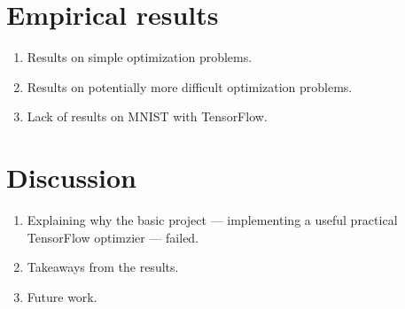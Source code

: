 \documentclass{article}
\begin{document}
\section{Empirical results}


\begin{enumerate}
  \item Results on simple optimization problems. 
  \item Results on potentially more difficult optimization problems.
  \item Lack of results on MNIST with TensorFlow.
\end{enumerate}


\section{Discussion}


\begin{enumerate}
  \item Explaining why the basic project --- implementing a useful practical
    TensorFlow optimzier --- failed.
  \item Takeaways from the results.
  \item Future work.
\end{enumerate}


\printbibliography[heading=bibintoc]
\end{document}
